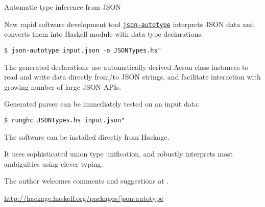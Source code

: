 \begin{hcarentry}[new]{Automatic type inference from JSON}
\label{jsonautotype}
\makeheader

New rapid software development tool \href{https://github.com/mgajda/json-autotype}{\texttt{json-autotype}} interprets JSON
data and converts them into Haskell module with data type declarations.

\begin{verbatim}
$ json-autotype input.json -o JSONTypes.hs"
\end{verbatim}

The generated declarations use automatically derived Aeson class instances
to read and write data directly from/to JSON strings,
and facilitate interaction with growing number of large JSON APIs.

Generated parser can be immediately tested on an input data:

\begin{verbatim}
$ runghc JSONTypes.hs input.json"
\end{verbatim}

The software can be installed directly from Hackage.

It uses sophisticated union type unification, and robustly
interprets most ambiguities using clever typing.

The author welcomes comments and suggestions at .

\FurtherReading
\url{http://hackage.haskell.org/packages/json-autotype}
\end{hcarentry}
